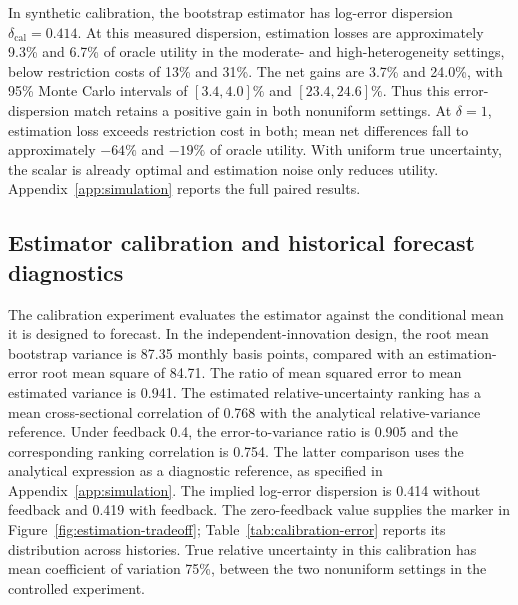 In synthetic calibration, the bootstrap estimator has log-error dispersion $\delta_{\mathrm{cal}}=0.414$. At this measured dispersion, estimation losses are approximately 9.3\% and 6.7\% of oracle utility in the moderate- and high-heterogeneity settings, below restriction costs of 13\% and 31\%. The net gains are 3.7\% and 24.0\%, with 95\% Monte Carlo intervals of $[3.4,4.0]\%$ and $[23.4,24.6]\%$. Thus this error-dispersion match retains a positive gain in both nonuniform settings. At $\delta=1$, estimation loss exceeds restriction cost in both; mean net differences fall to approximately $-64\%$ and $-19\%$ of oracle utility. With uniform true uncertainty, the scalar is already optimal and estimation noise only reduces utility. Appendix~\ref{app:simulation} reports the full paired results.

\FloatBarrier
\subsection{Estimator calibration and historical forecast diagnostics}
The calibration experiment evaluates the estimator against the conditional mean it is designed to forecast. In the independent-innovation design, the root mean bootstrap variance is 87.35 monthly basis points, compared with an estimation-error root mean square of 84.71. The ratio of mean squared error to mean estimated variance is 0.941. The estimated relative-uncertainty ranking has a mean cross-sectional correlation of 0.768 with the analytical relative-variance reference. Under feedback 0.4, the error-to-variance ratio is 0.905 and the corresponding ranking correlation is 0.754. The latter comparison uses the analytical expression as a diagnostic reference, as specified in Appendix~\ref{app:simulation}. The implied log-error dispersion is 0.414 without feedback and 0.419 with feedback. The zero-feedback value supplies the marker in Figure~\ref{fig:estimation-tradeoff}; Table~\ref{tab:calibration-error} reports its distribution across histories. True relative uncertainty in this calibration has mean coefficient of variation 75\%, between the two nonuniform settings in the controlled experiment.


